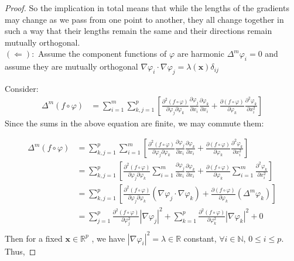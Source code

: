 \documentclass[12pt]{article}
\theoremstyle{definition}
\numberwithin{equation}{subsection}
\begin{document}
\begin{proof}
So the implication in total means that while the lengths of the gradients may change as we pass from one point to another, they all change together in such a way that their lengths remain the same and their directions remain mutually orthogonal.\\

$(\Leftarrow):$ Assume the component functions of $\varphi$ are harmonic $\Delta^m \varphi_i = 0$ and assume they are mutually orthogonal $\nabla\varphi_i \cdot \nabla\varphi_j = \lambda(\mathbf{x}) \delta_{ij}$

Consider:
\begin{align*}
\Delta^m(f\circ\varphi) &= \sum_{i =1}^{m} \sum_{k,j=1}^p  \left[ \frac{\partial^2  \left(f\circ\varphi\right)}{\partial \varphi_j \partial \varphi_k} \frac{\partial \varphi_j}{\partial x_i} \frac{\partial \varphi_k}{\partial x_i} + \frac{\partial(f\circ\varphi) }{\partial \varphi_k} \frac{\partial^2\varphi_k}{\partial x_i^2}  \right]
\end{align*}
Since the sums in the above equation are finite, we may commute them:

\begin{align*}
\Delta^m(f\circ\varphi) &=  \sum_{k,j=1}^p  \sum_{i =1}^{m}\left[ \frac{\partial^2  \left( f \circ \varphi\right)}{\partial \varphi_j \partial \varphi_k} \frac{\partial \varphi_j}{\partial x_i} \frac{\partial \varphi_k}{\partial x_i} + \frac{\partial(f\circ\varphi) }{\partial \varphi_k} \frac{\partial^2\varphi_k}{\partial x_i^2}  \right] \\
 &=  \sum_{k,j=1}^p \left[ \frac{\partial^2  \left( f \circ \varphi\right)}{\partial \varphi_j \partial \varphi_k}  \sum_{i =1}^{m} \frac{\partial \varphi_j}{\partial x_i} \frac{\partial \varphi_k}{\partial x_i} + \frac{\partial(f\circ\varphi) }{\partial \varphi_k}  \sum_{i =1}^{m}\frac{\partial^2\varphi_k}{\partial x_i^2}  \right]\\
 &= \sum_{k,j=1}^p \left[ \frac{\partial^2  \left( f \circ \varphi\right)}{\partial \varphi_j \partial \varphi_k}  (\nabla\varphi_j \cdot \nabla \varphi_k)  + \frac{\partial(f\circ\varphi) }{\partial \varphi_k}  (\Delta^m \varphi_k)  \right] \\
 &=   \sum_{j=1}^p \frac{\partial^2  \left( f \circ \varphi\right)}{\partial \varphi_j^2} |\nabla \varphi_j|^2 + \sum_{k=1}^p \frac{\partial^2  \left( f \circ \varphi\right)}{\partial \varphi_k^2}|\nabla \varphi_k|^2  + 0 \\
\end{align*}
Then for a fixed $\mathbf{x} \in \mathbb{R}^p$ , we have $|\nabla \varphi_i|^2 = \lambda \in \mathbb{R}$ constant, $\forall i \in \mathbb{N}$, $0 \leq i \leq p$. Thus,


\end{proof}
\end{document}
